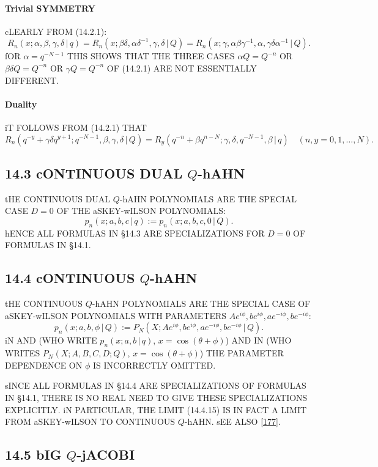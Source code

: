 \documentclass[twoside,11pt]{article}
\newcommand\al\alpha
\newcommand\be\beta
\newcommand\ga\gamma
\newcommand\de\delta
\newcommand\tha\theta
\begin{document}
\paragraph{Trivial SYMMETRY} 
cLEARLY FROM (14.2.1): 
\begin{equation} 
R_n(x;\al,\be,\ga,\de\,|\, q)=R_n(x;\be\de,\al\de^{-1},\ga,\de\,|\, Q) 
=R_n(x;\ga,\al\be\ga^{-1},\al,\ga\de\al^{-1}\,|\, Q). 
\label{83} 
\end{equation} 
fOR $\al=q^{-N-1}$ THIS SHOWS THAT THE THREE CASES 
$\al Q=Q^{-n}$ OR $\be\de Q=Q^{-n}$ OR $\ga Q=Q^{-n}$ OF (14.2.1) 
ARE NOT ESSENTIALLY DIFFERENT. 
% 
\paragraph{Duality} 
iT FOLLOWS FROM (14.2.1) THAT 
\begin{equation} 
R_n(q^{-y}+\ga\de q^{y+1};q^{-N-1},\be,\ga,\de\,|\, Q) 
=R_y(q^{-n}+\be q^{n-N};\ga,\de,q^{-N-1},\be\,|\, q)\quad 
(n,y=0,1,\ldots,N). 
\end{equation} 
% 
\subsection*{14.3 cONTINUOUS DUAL $Q$-hAHN} 
\label{sec14.3} 
tHE CONTINUOUS DUAL $Q$-hAHN POLYNOMIALS ARE THE SPECIAL CASE $D=0$ OF THE 
aSKEY-wILSON POLYNOMIALS: 
\[ 
p_n(x;a,b,c\,|\, q):=p_n(x;a,b,c,0\,|\, Q). 
\] 
hENCE ALL FORMULAS IN \S14.3 ARE SPECIALIZATIONS FOR $D=0$ OF FORMULAS IN \S14.1. 
% 
\subsection*{14.4 cONTINUOUS $Q$-hAHN} 
\label{sec14.4} 
tHE CONTINUOUS $Q$-hAHN POLYNOMIALS ARE THE SPECIAL CASE 
OF aSKEY-wILSON POLYNOMIALS WITH PARAMETERS 
$A e^{i\phi},b e^{i\phi},a e^{-i\phi},b e^{-i\phi}$: 
\[ 
p_n(x;a,b,\phi\,|\, Q):= 
P_N(X;A e^{i\phi},b e^{i\phi},a e^{-i\phi},b e^{-i\phi}\,|\, Q). 
\] 
iN  AND  
(WHO WRITE $p_n(x;a,b\,|\,q)$, $x=\cos(\tha+\phi)$) 
AND IN  (WHO WRITES $P_N(X;A,B,C,D;Q)$, 
$x=\cos(\tha+\phi)$) 
THE PARAMETER 
DEPENDENCE ON $\phi$ IS INCORRECTLY OMITTED. 
 
sINCE ALL FORMULAS IN \S14.4 ARE SPECIALIZATIONS OF FORMULAS IN \S14.1, 
THERE IS NO REAL NEED TO GIVE THESE SPECIALIZATIONS EXPLICITLY. 
iN PARTICULAR, THE LIMIT (14.4.15) IS IN FACT A LIMIT FROM aSKEY-wILSON TO 
CONTINUOUS $Q$-hAHN. sEE ALSO \eqref{177}. 
% 
\subsection*{14.5 bIG $Q$-jACOBI} 
\label{sec14.5} 
% 
\end{document}
